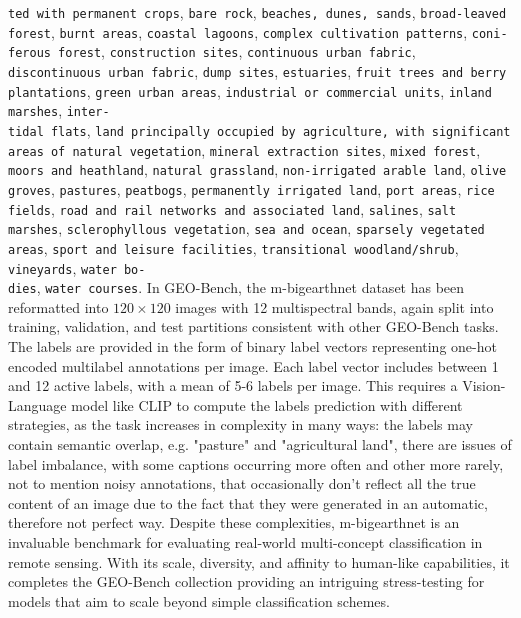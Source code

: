 \documentclass[a4paper, twoside, english]{sapthesis} %
\begin{document}
\texttt{ted with permanent crops}, \texttt{bare rock}, \texttt{beaches, dunes, sands}, \texttt{broad-leaved forest}, \texttt{burnt areas}, \texttt{coastal lagoons}, \texttt{complex cultivation patterns}, \texttt{coni-}\\ \texttt{ferous forest}, \texttt{construction sites}, \texttt{continuous urban fabric}, \texttt{discontinuous urban fabric}, \texttt{dump sites}, \texttt{estuaries}, \texttt{fruit trees and berry plantations}, \texttt{green urban areas}, \texttt{industrial or commercial units}, \texttt{inland marshes}, \texttt{inter-} \\ \texttt{tidal flats}, \texttt{land principally occupied by agriculture, with significant areas of natural vegetation}, \texttt{mineral extraction sites}, \texttt{mixed forest}, \\ \texttt{moors and heathland}, \texttt{natural grassland}, \texttt{non-irrigated arable land}, \texttt{olive groves}, \texttt{pastures}, \texttt{peatbogs}, \texttt{permanently irrigated land}, \texttt{port areas}, \texttt{rice fields}, \texttt{road and rail networks and associated land}, \texttt{salines}, \texttt{salt marshes}, \texttt{sclerophyllous vegetation}, \texttt{sea and ocean}, \texttt{sparsely vegetated areas}, \texttt{sport and leisure facilities}, \texttt{transitional woodland/shrub}, \texttt{vineyards}, \texttt{water bo-} \\ \texttt{dies}, \texttt{water courses}. In GEO-Bench, the m-bigearthnet dataset has been reformatted into $120\times 120$ images with 12 multispectral bands, again split into training, validation, and test partitions consistent with other GEO-Bench tasks. The labels are provided in the form of binary label vectors representing one-hot encoded multilabel annotations per image. Each label vector includes between 1 and 12 active labels, with a mean of 5-6 labels per image. This requires a Vision-Language model like CLIP to compute the labels prediction with different strategies, as the task increases in complexity in many ways: the labels may contain semantic overlap, e.g. "pasture" and "agricultural land", there are issues of label imbalance, with some captions occurring more often and other more rarely, not to mention noisy annotations, that occasionally don't reflect all the true content of an image due to the fact that they were generated in an automatic, therefore not perfect way. Despite these complexities, m-bigearthnet is an invaluable benchmark for evaluating real-world multi-concept classification in remote sensing. With its scale, diversity, and affinity to human-like capabilities, it completes the GEO-Bench collection providing an intriguing stress-testing for models that aim to scale beyond simple classification schemes.
\end{document}
